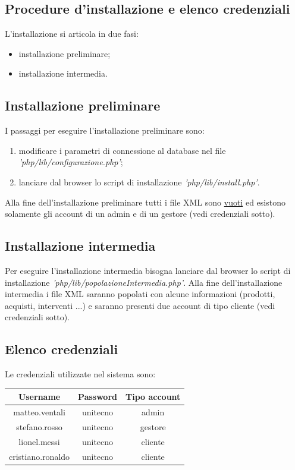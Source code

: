 \documentclass[a4paper, 14pt]{article}
\begin{document}
\begin{flushleft}
	\section{Procedure d'installazione e elenco credenziali}
		L'installazione si articola in due fasi:
		\begin{itemize}
			\item installazione preliminare;
			\item installazione intermedia.
		\end{itemize}
	
		\subsection{Installazione preliminare}
		I passaggi per eseguire l'installazione preliminare sono:
		\begin{enumerate}
			\item modificare i parametri di connessione al database nel file \textit{'php/lib/configurazione.php'};
			\item lanciare dal browser lo script di installazione \textit{'php/lib/install.php'}.
		\end{enumerate}
		Alla fine dell'installazione preliminare tutti i file XML sono \underline{vuoti} ed esistono solamente gli 
		account di un admin e di un gestore (vedi credenziali sotto).
		
		\subsection{Installazione intermedia}
		Per eseguire l'installazione intermedia bisogna lanciare dal browser lo script di installazione \textit{'php/lib/popolazioneIntermedia.php'}.
		Alla fine dell'installazione intermedia i file XML saranno popolati con alcune informazioni (prodotti, acquisti, interventi ...) e saranno presenti due account di tipo cliente (vedi credenziali sotto).
		
		\subsection{Elenco credenziali}
		Le credenziali utilizzate nel sistema sono: \\
		\begin{center}
		\begin{tabular}{ | c | c | c| }
			\hline
				\textbf{Username} & \textbf{Password}  & \textbf{Tipo account} \\
			\hline
				matteo.ventali & unitecno & admin \\
			\hline
				stefano.rosso & unitecno & gestore \\
			\hline
				lionel.messi & unitecno & cliente \\
			\hline
				cristiano.ronaldo & unitecno & cliente \\
			\hline
		\end{tabular}
		\end{center}
	\end{flushleft}
\end{document}
